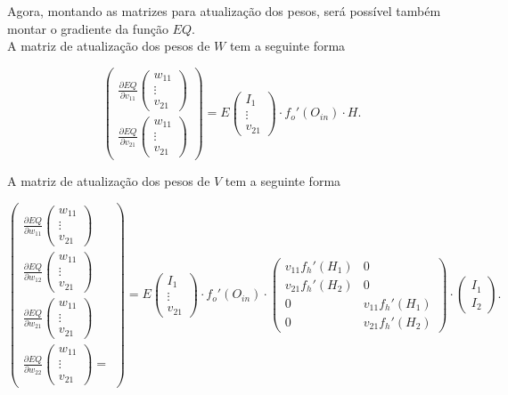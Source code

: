 \documentclass[a4paper,12pt]{article}
\begin{document}
Agora, montando as matrizes para atualização dos pesos, será possível também montar o gradiente da função $EQ$.\\

A matriz de atualização dos pesos de $W$ tem a seguinte forma


$$
\begin{pmatrix} \frac{\partial EQ}{\partial v_{11}}\begin{pmatrix}w_{11}\\\vdots\\v_{21}\end{pmatrix}\\\frac{\partial EQ}{\partial v_{21}}\begin{pmatrix}w_{11}\\\vdots\\v_{21}\end{pmatrix} \end{pmatrix} = E\begin{pmatrix}I_{1}\\ \vdots \\v_{21} \end{pmatrix}\cdot f_o'(O_{in})\cdot H.
$$

A matriz de atualização dos pesos de $V$ tem a seguinte forma

$$
\begin{pmatrix}
\frac{\partial EQ}{\partial w_{11}}\begin{pmatrix}w_{11}\\\vdots\\v_{21}\end{pmatrix}\\\frac{\partial EQ}{\partial w_{12}}\begin{pmatrix}w_{11}\\\vdots\\v_{21}\end{pmatrix}
\\
 \frac{\partial EQ}{\partial w_{21}}\begin{pmatrix}w_{11}\\\vdots\\v_{21}\end{pmatrix} 
 \\
 \frac{\partial EQ}{\partial w_{22}}\begin{pmatrix}w_{11}\\\vdots\\v_{21}\end{pmatrix} =
\end{pmatrix} =  E\begin{pmatrix}I_{1}\\ \vdots \\v_{21} \end{pmatrix}\cdot f_o'(O_{in})\cdot
\begin{pmatrix}
v_{11} f_h'(H_1) & 0 \\ 
v_{21}f_h'(H_2) & 0 \\
0 & v_{11} f_h'(H_1)\\
0 & v_{21}f_h'(H_2)
\end{pmatrix} \cdot
\begin{pmatrix}
I_1 \\ I_2
\end{pmatrix}.
$$
\end{document}
